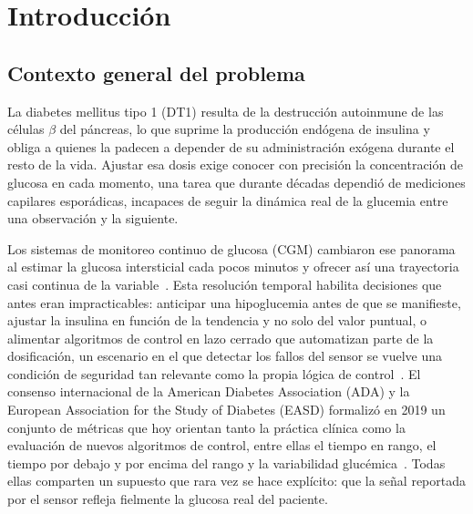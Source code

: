 \documentclass{report}
\begin{document}
\chapter{Introducción}

\section{Contexto general del problema}
\label{sec:contexto_general}

La diabetes mellitus tipo 1 (DT1) resulta de la destrucción autoinmune de las células $\beta$ del páncreas, lo que suprime la producción endógena de insulina y obliga a quienes la padecen a depender de su administración exógena durante el resto de la vida. Ajustar esa dosis exige conocer con precisión la concentración de glucosa en cada momento, una tarea que durante décadas dependió de mediciones capilares esporádicas, incapaces de seguir la dinámica real de la glucemia entre una observación y la siguiente.

Los sistemas de monitoreo continuo de glucosa (CGM) cambiaron ese panorama al estimar la glucosa intersticial cada pocos minutos y ofrecer así una trayectoria casi continua de la variable~\cite{cobelli2009diabetes}. Esta resolución temporal habilita decisiones que antes eran impracticables: anticipar una hipoglucemia antes de que se manifieste, ajustar la insulina en función de la tendencia y no solo del valor puntual, o alimentar algoritmos de control en lazo cerrado que automatizan parte de la dosificación, un escenario en el que detectar los fallos del sensor se vuelve una condición de seguridad tan relevante como la propia lógica de control~\cite{sanchez2025imputation}. El consenso internacional de la American Diabetes Association (ADA) y la European Association for the Study of Diabetes (EASD) formalizó en 2019 un conjunto de métricas que hoy orientan tanto la práctica clínica como la evaluación de nuevos algoritmos de control, entre ellas el tiempo en rango, el tiempo por debajo y por encima del rango y la variabilidad glucémica~\cite{battelino2019}. Todas ellas comparten un supuesto que rara vez se hace explícito: que la señal reportada por el sensor refleja fielmente la glucosa real del paciente.
\end{document}
